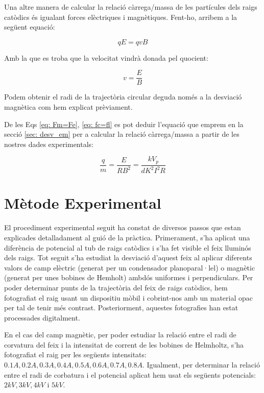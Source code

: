 \documentclass[11pt]{article}
\begin{document}
\vspace{1cm}

Una altre manera de calcular la relació càrrega/massa de les partícules dels raigs catòdics és igualant forces elèctriques i magnètiques. Fent-ho, arribem a la següent equació:

\begin{equation}\label{eq: Fm=Fe}
    qE = qvB
\end{equation}

Amb la que es troba que la velocitat vindrà donada pel quocient:

\begin{equation}
    v = \frac{E}{B}
\end{equation}

Podem obtenir el radi de la trajectòria circular deguda només a la desviació magnètica com hem explicat prèviament.

De les Eqs \eqref{eq: Fm=Fe}, \eqref{eq: fc=fl} es pot deduir l'equació que emprem en la secció \ref{sec: desv_em} per a calcular la relació càrrega/massa a partir de les nostres dades experimentals:

\begin{equation}
    \frac{q}{m}=\frac{E}{RB^2}=\frac{kV_p}{dK^2I^2R}
\end{equation}

\newpage
\section{Mètode Experimental}

El procediment experimental seguit ha constat de diversos passos que estan explicades detalladament al guió de la pràctica. 
Primerament, s'ha aplicat una diferència de potencial al tub de raigs catòdics i s'ha fet visible el feix lluminós dels raigs. Tot seguit s'ha estudiat la desviació d'aquest feix al aplicar diferents valors de camp elèctric (generat per un condensador planoparal·lel) o magnètic (generat per unes bobines de Hemholt) ambdós uniformes i perpendiculars. Per poder determinar punts de la trajectòria del feix de raigs catòdics, hem fotografiat el raig usant un dispositiu mòbil i cobrint-nos amb un material opac per tal de tenir més contrast. Posteriorment, aquestes fotografies han estat processades digitalment.

En el cas del camp magnètic, per poder estudiar la relació entre el radi de corvatura del feix i la intensitat de corrent de les bobines de Helmholtz, s'ha fotografiat el raig per les següents intensitats:  $0.1A, 0.2A, 0.3A, 0.4A, 0.5A, 0.6A, 0.7A, 0.8A$. Igualment, per determinar la relació entre el radi de corbatura i el potencial aplicat hem usat els següents potencials: $2kV, 3kV, 4kV$ i $5kV$.
\end{document}
